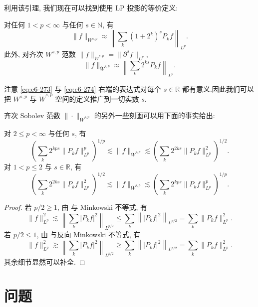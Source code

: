 利用该引理, 我们现在可以找到使用 LP 投影的等价定义:

\begin{proposition}\label{prop:c6-6.18}
对任何 $1 < p < \infty$ 与任何 $s \in \mathbb{N}$, 有
\begin{equation}
\|f\|_{W^{s, p}} \approx \left\|\sum_k (1 + 2^k)^s P_k f\right\|_{L^p}.\label{eq:c6-273}
\end{equation}
此外, 对齐次 $W^{s, p}$ 范数 $\|f\|_{\dot{W}^{s, p}} = \|\partial^s f\|_{L^p}$,
\begin{equation}
\|f\|_{\dot{W}^{s, p}} \approx \left\|\sum_k 2^{ks} P_k f\right\|_{L^p}.\label{eq:c6-274}
\end{equation}
\end{proposition}

注意 \eqref{eq:c6-273} 与 \eqref{eq:c6-274} 右端的表达式对每个 $s \in \mathbb{R}$ 都有意义.因此我们可以把 $W^{s, p}$ 与 $\dot{W}^{s, p}$ 空间的定义推广到一切实数 $s$.

齐次 Sobolev 范数 $\|\cdot\|_{\dot{W}^{s, p}}$ 的另外一些刻画可以用下面的事实给出:

\begin{proposition}\label{prop:c6-6.19}
对 $2 \leq p < \infty$ 与任何 $s$, 有
\begin{equation}
\left(\sum_k 2^{kps} \|P_k f\|^p_{L^p}\right)^{1/p} \lesssim \|f\|_{\dot{W}^{s, p}} \lesssim \left(\sum_k 2^{2ks} \|P_k f\|^2_{L^p}\right)^{1/2}.\label{eq:c6-275}
\end{equation}
对 $1 < p \leq 2$ 与 $s \in \mathbb{R}$, 有
\begin{equation}
\left(\sum_k 2^{2ks} \|P_k f\|^2_{L^p}\right)^{1/2} \lesssim \|f\|_{\dot{W}^{s, p}} \lesssim \left(\sum_k 2^{kps} \|P_k f\|^p_{L^p}\right)^{1/p}.\label{eq:c6-276}
\end{equation}
\end{proposition}

\begin{proof}
若 $p/2 \geq 1$, 由 与 Minkowski 不等式, 有
\[
\|f\|^2_{L^p} \lesssim \left\|\sum_k |P_k f|^2\right\|_{L^{p/2}} \leq \sum_k \left\||P_k f|^2\right\|_{L^{p/2}} = \sum_k \|P_k f\|^2_{L^p}.
\]
若 $p/2 \leq 1$, 由 与反向 Minkowski 不等式, 有
\[
\|f\|^2_{L^p} \gtrsim \left\|\sum_k |P_k f|^2\right\|_{L^{p/2}} \geq \sum_k \left\||P_k f|^2\right\|_{L^{p/2}} = \sum_k \|P_k f\|^2_{L^p}.
\]
其余细节显然可以补全.
\end{proof}
\section{问题}

